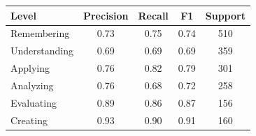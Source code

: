 \begin{tabular}{lcccc}
\hline
Level & Precision & Recall & F1 & Support \\
\hline
Remembering & 0.73 & 0.75 & 0.74 & 510 \\
Understanding & 0.69 & 0.69 & 0.69 & 359 \\
Applying & 0.76 & 0.82 & 0.79 & 301 \\
Analyzing & 0.76 & 0.68 & 0.72 & 258 \\
Evaluating & 0.89 & 0.86 & 0.87 & 156 \\
Creating & 0.93 & 0.90 & 0.91 & 160 \\
\hline
\end{tabular}